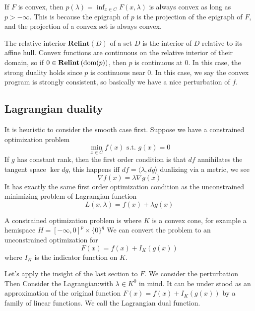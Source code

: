 \documentclass[a4paper]{mynotes}
\def\ri{\mathbf{Relint}}
\begin{document}
If $F$ is convex, then $p(\lambda)=\inf_{x\in C} F(x,\lambda)$ is always convex as long as $p>-\infty$. This is because the epigraph of $p$ is the projection of the epigraph of $F$, and the projection of a convex set is always convex. 

 The relative interior $\ri(D)$ of a set $D$ is the interior of $D$ relative to its affine hull. Convex functions are continuous on the relative interior of their domain, so if $0\in \ri\yk{\text{dom} (p)}$, then $p$ is continuous at $0$. In this case, the strong duality holds since $p$ is continuous near $0$. In this case, we say the convex program is strongly consistent, so basically we have a nice perturbation of $f$.

\subsection{Lagrangian duality}

It is heuristic to consider the smooth case first. Suppose we have a constrained optimization problem $$\min_{x\in C} f(x) \text{ s.t. } g(x)=0$$  If $g$ has constant rank, then the first order condition is that $df$ annihilates the tangent space $\ker dg$, this happens iff $df=\langle\lambda, dg\rangle$ dualizing via a metric, we see  $$\nabla f(x)=\lambda \nabla g(x)$$ It has exactly the same first order optimization condition as the unconstrained minimizing problem of Lagrangian function $$L(x,\lambda)=f(x)+\lambda g(x)$$

A constrained optimization problem is  where $K$ is a convex cone, for example a hemispace $H=[-\infty,0]^p\times  \{0\}^q$ We can convert the problem to an unconstrained optimization for $$F(x)= f(x)+I_K(g(x)) $$ where $I_K$ is the indicator function on $K$. 

Let's apply the insight of the last section to $F$. We consider the perturbation Then 
Consider the Lagrangian:with $\lambda\in K^0$ in mind. It can be under stood as an approximation of the original function $F(x)=f(x)+I_K(g(x))$ by a family of linear functions. 
We call the Lagrangian dual function.
\end{document}
